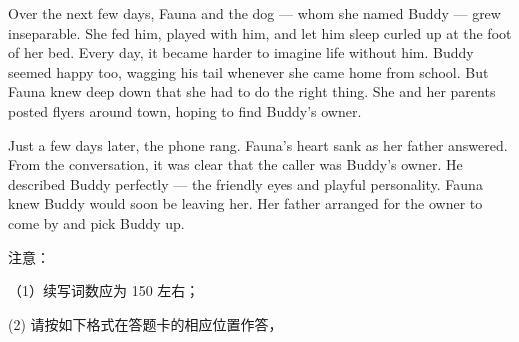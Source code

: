 \documentclass{英语试卷}
\begin{document}
\par Over the next few days, Fauna and the dog — whom she named Buddy — grew inseparable. She fed him, played with him, and let him sleep curled up at the foot of her bed. Every day, it became harder to imagine life without him. Buddy seemed happy too, wagging his tail whenever she came home from school. But Fauna knew deep down that she had to do the right thing. She and her parents posted flyers around town, hoping to find Buddy's owner.\par
\par Just a few days later, the phone rang. Fauna's heart sank as her father answered. From the conversation, it was clear that the caller was Buddy's owner. He described Buddy perfectly — the friendly eyes and playful personality. Fauna knew Buddy would soon be leaving her. Her father arranged for the owner to come by and pick Buddy up.\par
\par 注意：\par
\par （1）续写词数应为 150 左右；\par
\par (2) 请按如下格式在答题卡的相应位置作答，\par
{}
\end{document}
